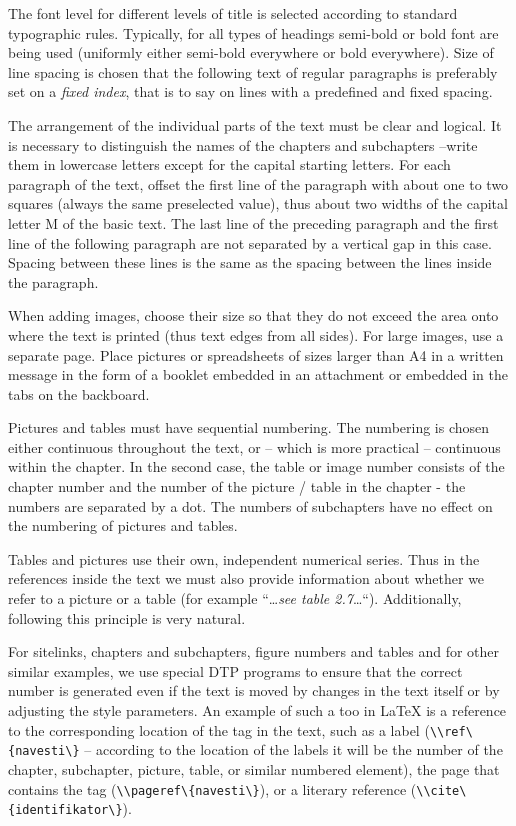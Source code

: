 \documentclass[english,odsaz]{fitthesis}
\begin{document}
The font level for different levels of title is selected according to standard
typographic rules.  Typically, for all types of headings semi-bold or bold font
are being used (uniformly either semi-bold everywhere or bold everywhere). Size
of line spacing is chosen that the following text of regular paragraphs is
preferably set on a \emph{fixed index}, that is to say on lines with a predefined
and fixed spacing.

The arrangement of the individual parts of the text must be clear and
logical. It is necessary to distinguish the names of the chapters and
subchapters --write them in lowercase letters except for the capital starting
letters. For each paragraph of the text, offset the first line of the paragraph
with about one to two squares (always the same preselected value), thus about
two widths of the capital letter M of the basic text. The last line of the
preceding paragraph and the first line of the following paragraph are not
separated by a vertical gap in this case. Spacing between these lines is the
same as the spacing between the lines inside the paragraph.

When adding images, choose their size so that they do not exceed the area onto
where the text is printed (thus text edges from all sides). For large images,
use a separate page. Place pictures or spreadsheets of sizes larger than A4 in a
written message in the form of a booklet embedded in an attachment or embedded
in the tabs on the backboard.

Pictures and tables must have sequential numbering. The numbering is chosen
either continuous throughout the text, or -- which is more practical --
continuous within the chapter. In the second case, the table or image number
consists of the chapter number and the number of the picture / table in the
chapter - the numbers are separated by a dot. The numbers of subchapters have no
effect on the numbering of pictures and tables.

Tables and pictures use their own, independent numerical series. Thus in the
references inside the text we must also provide information about whether we
refer to a picture or a table (for example ``\ldots \emph{see table
2.7}\ldots``). Additionally, following this principle is very natural.

For sitelinks, chapters and subchapters, figure numbers and tables and for other
similar examples, we use special DTP programs to ensure that the correct number
is generated even if the text is moved by changes in the text itself or by
adjusting the style parameters. An example of such a too in \LaTeX{} is a reference
to the corresponding location of the tag in the text, such as a label
(\verb~\\ref\{navesti\}~ -- according to the location of the labels it will be the
number of the chapter, subchapter, picture, table, or similar numbered element),
the page that contains the tag (\verb~\\pageref\{navesti\}~), or a literary reference
(\verb~\\cite\{identifikator\}~).
\end{document}
